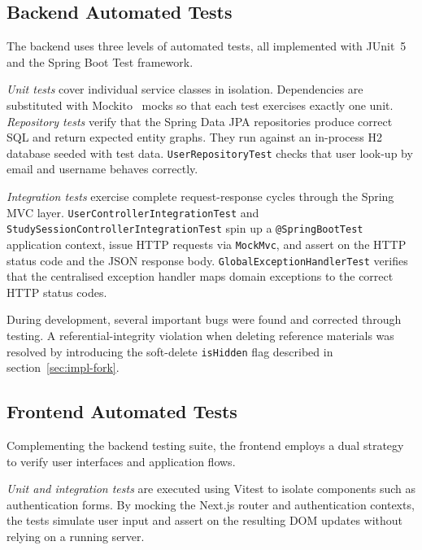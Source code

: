 \subsection{Backend Automated Tests}
\label{subsec:backend-tests}

The backend uses three levels of automated tests, all implemented with JUnit~5~\cite{JUnit5} and the Spring
Boot Test framework.

\emph{Unit tests} cover individual service classes in isolation. Dependencies are substituted
with Mockito~\cite{Mockito} mocks so that each test exercises exactly one unit.
\emph{Repository tests} verify that the Spring Data JPA repositories produce correct SQL and
return expected entity graphs. They run against an in-process H2 database seeded with test data.
\texttt{User\allowbreak RepositoryTest} checks that user look-up by email and username behaves correctly.

\emph{Integration tests} exercise complete request-response cycles through the \newline Spring MVC layer.
\texttt{User\allowbreak Controller\allowbreak Integration\allowbreak Test} and \texttt{StudySession\allowbreak Controller\allowbreak Integration\allowbreak Test} spin
up a \texttt{@Spring\allowbreak BootTest} application context, issue HTTP requests via \texttt{MockMvc}, and
assert on the HTTP status code and the JSON response body. \texttt{Global\allowbreak Exception\allowbreak HandlerTest}
verifies that the centralised exception handler maps domain exceptions to the correct HTTP status
codes.

During development, several important bugs were found and corrected through testing. A
referential-integrity violation when deleting reference materials was resolved by introducing the
soft-delete \texttt{isHidden} flag described in section~\ref{sec:impl-fork}.

\subsection{Frontend Automated Tests}
\label{subsec:frontend-tests}

Complementing the backend testing suite, the frontend employs a dual strategy to verify user interfaces and application flows.

\emph{Unit and integration tests} are executed using Vitest to isolate components such as authentication forms. By mocking the Next.js router and authentication contexts, the tests simulate user input and assert on the resulting DOM updates without relying on a running server.

